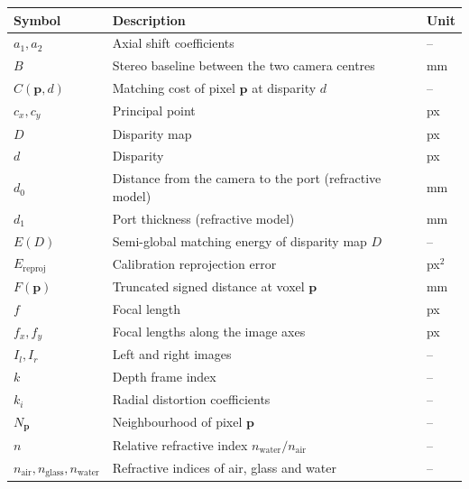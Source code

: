 \begin{tabularx}{\textwidth}{@{}l X U@{}}
\toprule
\textbf{Symbol} & \textbf{Description} & \textbf{Unit} \\
\midrule
$a_1, a_2$          & Axial shift coefficients                                   & -- \\
$B$                 & Stereo baseline between the two camera centres             & mm \\
$C(\mathbf{p}, d)$  & Matching cost of pixel $\mathbf{p}$ at disparity $d$       & -- \\
$c_x, c_y$          & Principal point                                            & px \\
$D$                 & Disparity map                                              & px \\
$d$                 & Disparity                                                  & px \\
$d_0$               & Distance from the camera to the port (refractive model)    & mm \\
$d_1$               & Port thickness (refractive model)                          & mm \\
$E(D)$              & Semi-global matching energy of disparity map $D$           & -- \\
$E_{\text{reproj}}$ & Calibration reprojection error                             & px$^2$ \\
$F(\mathbf{p})$     & Truncated signed distance at voxel $\mathbf{p}$            & mm \\
$f$                 & Focal length                                               & px \\
$f_x, f_y$          & Focal lengths along the image axes                         & px \\
$I_l, I_r$          & Left and right images                                      & -- \\
$k$                 & Depth frame index                                          & -- \\
$k_i$               & Radial distortion coefficients                             & -- \\
$N_\mathbf{p}$      & Neighbourhood of pixel $\mathbf{p}$                        & -- \\
$n$                 & Relative refractive index $n_\text{water} / n_\text{air}$ & -- \\
$n_\text{air}, n_\text{glass}, n_\text{water}$ & Refractive indices of air, glass and water & -- \\

\end{tabularx}
